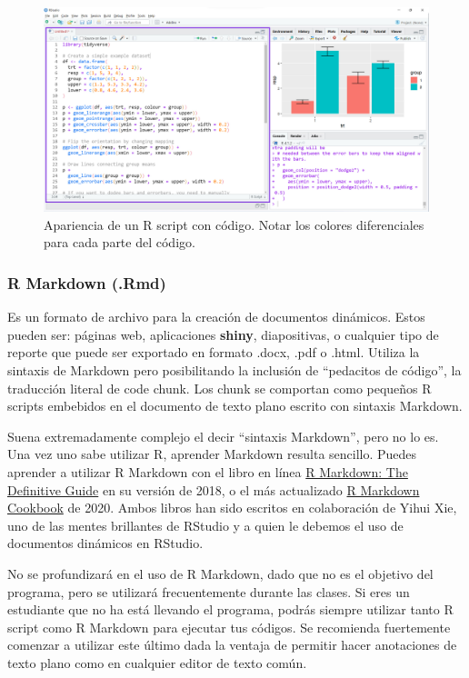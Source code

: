 \documentclass[
]{article}
\theoremstyle{definition}
\theoremstyle{definition}
\theoremstyle{definition}
\theoremstyle{definition}
\theoremstyle{remark}
\begin{document}
\begin{figure}

{\centering \includegraphics[width=1\linewidth]{figs/screenshots/Rscript} 

}

\caption{Apariencia de un R script con código. Notar los colores diferenciales para cada parte del código.}\label{fig:figura22}
\end{figure}

\hypertarget{r-markdown-.rmd}{%
\subsubsection{R Markdown (.Rmd)}\label{r-markdown-.rmd}}

Es un formato de archivo para la creación de documentos dinámicos. Estos pueden ser: páginas web, aplicaciones \textbf{shiny}, diapositivas, o cualquier tipo de reporte que puede ser exportado en formato .docx, .pdf o .html. Utiliza la sintaxis de Markdown pero posibilitando la inclusión de ``pedacitos de código'', la traducción literal de code chunk. Los chunk se comportan como pequeños R scripts embebidos en el documento de texto plano escrito con sintaxis Markdown.

Suena extremadamente complejo el decir ``sintaxis Markdown'', pero no lo es. Una vez uno sabe utilizar R, aprender Markdown resulta sencillo. Puedes aprender a utilizar R Markdown con el libro en línea \href{https://bookdown.org/yihui/rmarkdown/}{R Markdown: The Definitive Guide} en su versión de 2018, o el más actualizado \href{https://bookdown.org/yihui/rmarkdown-cookbook/}{R Markdown Cookbook} de 2020. Ambos libros han sido escritos en colaboración de Yihui Xie, uno de las mentes brillantes de RStudio y a quien le debemos el uso de documentos dinámicos en RStudio.

No se profundizará en el uso de R Markdown, dado que no es el objetivo del programa, pero se utilizará frecuentemente durante las clases. Si eres un estudiante que no ha está llevando el programa, podrás siempre utilizar tanto R script como R Markdown para ejecutar tus códigos. Se recomienda fuertemente comenzar a utilizar este último dada la ventaja de permitir hacer anotaciones de texto plano como en cualquier editor de texto común.
\end{document}
